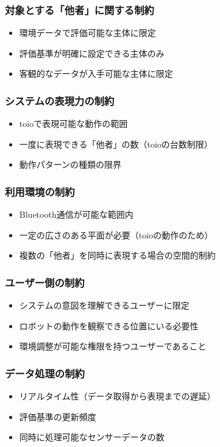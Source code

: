 \documentclass[paper=a4paper,jafontsize=9pt,head_space=15mm,gutter=20mm,
twocolumn,number_of_lines=49, line_length=26zw]{myuarticle}
\begin{document}
\subsubsection{対象とする「他者」に関する制約}
\begin{itemize}
  \item 環境データで評価可能な主体に限定
  \item 評価基準が明確に設定できる主体のみ
  \item 客観的なデータが入手可能な主体に限定
\end{itemize}

\subsubsection{システムの表現力の制約}
\begin{itemize}
  \item toioで表現可能な動作の範囲
  \item 一度に表現できる「他者」の数（toioの台数制限）
  \item 動作パターンの種類の限界
\end{itemize}

\subsubsection{利用環境の制約}
\begin{itemize}
  \item Bluetooth通信が可能な範囲内
  \item 一定の広さのある平面が必要（toioの動作のため）
  \item 複数の「他者」を同時に表現する場合の空間的制約
\end{itemize}

\subsubsection{ユーザー側の制約}
\begin{itemize}
  \item システムの意図を理解できるユーザーに限定
  \item ロボットの動作を観察できる位置にいる必要性
  \item 環境調整が可能な権限を持つユーザーであること
\end{itemize}

\subsubsection{データ処理の制約}
\begin{itemize}
  \item リアルタイム性（データ取得から表現までの遅延）
  \item 評価基準の更新頻度
  \item 同時に処理可能なセンサーデータの数
\end{itemize}
\end{document}

